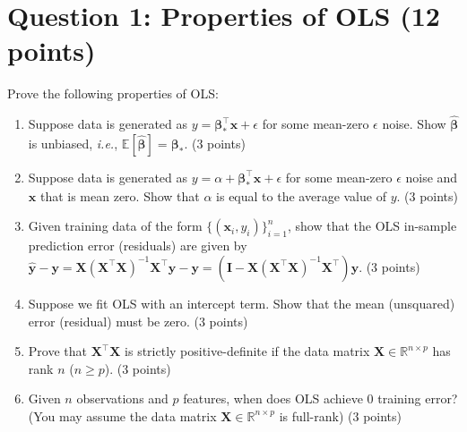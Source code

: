 \documentclass[10pt]{article}
\newcommand{\R}{\mathbb{R}}
\newcommand{\bx}{\bm{x}}
\newcommand{\bI}{\bm{I}}
\newcommand{\bX}{\bm{X}}
\newcommand{\by}{\bm{y}}
\newcommand{\bbeta}{\bm{\beta}}
\newcommand{\E}{\mathbb{E}}
\begin{document}
\section*{Question 1: Properties of OLS (12 points)}
Prove the following properties of OLS: 
\begin{enumerate}[label={(\alph*)}]
\item Suppose data is generated as $y = \bbeta_*^{\top}\bx + \epsilon$ for some mean-zero $\epsilon$ noise. Show $\hat{\bbeta}$ is unbiased, \emph{i.e.}, $\E[\hat{\bbeta}] = \bbeta_*$. (3 points)
\item Suppose data is generated as $y = \alpha +  \bbeta_*^{\top}\bx + \epsilon$ for some mean-zero $\epsilon$ noise and $\bx$ that is mean zero. Show that $\alpha$ is equal to the average value of $y$. (3 points)
\item Given training data of the form $\{(\bx_i, y_i)\}_{i=1}^n$, show that the OLS in-sample prediction error (residuals) are given by $\hat{\by} - \by = \bX(\bX^{\top}\bX)^{-1}\bX^{\top}\by - \by = (\bI - \bX(\bX^{\top}\bX)^{-1}\bX^{\top})\by$. (3 points)
\item Suppose we fit OLS with an intercept term. Show that the mean (unsquared) error (residual) must be zero. (3 points)
\item Prove that $\bX^{\top}\bX$ is strictly positive-definite if the data matrix $\bX \in \R^{n \times p}$ has rank $n$ ($n \geq p$). (3 points)
\item Given $n$ observations and $p$ features, when  does OLS achieve 0 training error? (You may assume the data matrix $\bX \in \R^{n \times p}$ is full-rank) (3 points)
\end{enumerate}
\end{document}
